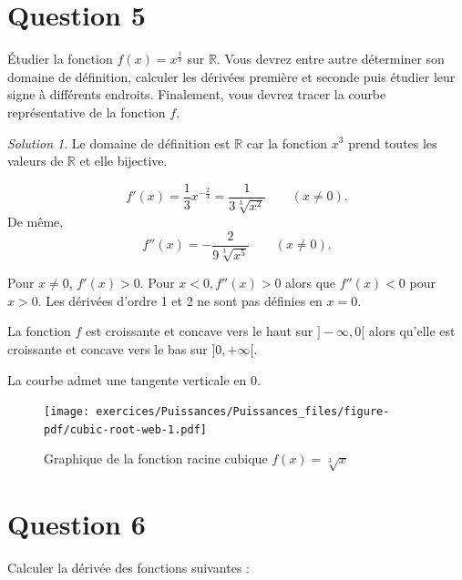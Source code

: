 \documentclass[
  12pt,
  letterpaper,
]{book}
\theoremstyle{remark}
\newtheorem*{solution}{Solution}
\begin{document}
\hypertarget{question-5-1}{%
\section{Question 5}\label{question-5-1}}

Étudier la fonction \(f(x) = x^{\frac{1}{3}}\) sur \(\mathbb{R}\). Vous
devrez entre autre déterminer son domaine de définition, calculer les
dérivées première et seconde puis étudier leur signe à différents
endroits. Finalement, vous devrez tracer la courbe représentative de la
fonction \(f\).

\begin{solution}

Le domaine de définition est \(\mathbb{R}\) car la fonction \(x^3\)
prend toutes les valeurs de \(\mathbb{R}\) et elle bijective.

\[f'(x) = \frac{1}{3}x^{-\frac{2}{3}}=\frac{1}{3\sqrt[3]{x^2}}\qquad(x\neq 0).\]
De même, \[f''(x) = -\frac{2}{9\sqrt[3]{x^5}}\qquad(x\neq 0).\]

Pour \(x \neq 0\), \(f'(x) > 0\). Pour \(x<0, f''(x)>0\) alors que
\(f''(x)<0\) pour \(x>0\). Les dérivées d'ordre 1 et 2 ne sont pas
définies en \(x=0\).

La fonction \(f\) est croissante et concave vers le haut sur
\(]-\infty,0[\) alors qu'elle est croissante et concave vers le bas sur
\(]0,+\infty[\).

La courbe admet une tangente verticale en 0.

\begin{figure}

{\centering \texttt{[image: exercices/Puissances/Puissances\_files/figure-pdf/cubic-root-web-1.pdf]}

}

\caption{Graphique de la fonction racine cubique \(f(x)=\sqrt[3]{x}\)}

\end{figure}

\end{solution}

\hypertarget{question-6-1}{%
\section{Question 6}\label{question-6-1}}

Calculer la dérivée des fonctions suivantes :
\end{document}
